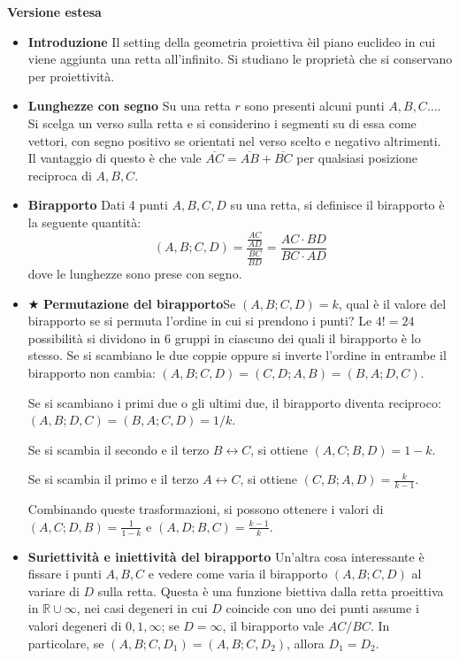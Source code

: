 \vspace{0.3cm}
\large{\textbf{Versione estesa}}\normalsize
\begin{itemize}

\vspace{0.3cm}
\item \textbf{Introduzione} Il setting della geometria proiettiva èil piano euclideo in cui viene aggiunta una retta all'infinito. Si studiano le proprietà che si conservano per proiettività.

\item \textbf{Lunghezze con segno} Su una retta $r$ sono presenti alcuni punti $A,B,C\ldots$. Si scelga un verso sulla retta e si considerino i segmenti su di essa come vettori, con segno positivo se orientati nel verso scelto e negativo altrimenti. Il vantaggio di questo è che vale $\overline{AC}=\overline{AB}+\overline{BC}$ per qualsiasi posizione reciproca di $A,B,C$.

\item \textbf{Birapporto} Dati 4 punti $A,B,C,D$ su una retta, si definisce il birapporto è la seguente quantità:
$$(A,B;C,D)=\frac{\frac{AC}{AD}}{\frac{BC}{BD}}=\frac{AC\cdot BD}{BC\cdot AD}$$
dove le lunghezze sono prese con segno.

\item $\bigstar$ \textbf{Permutazione del birapporto}Se $(A,B;C,D)=k$, qual è il valore del birapporto se si permuta l'ordine in cui si prendono i punti? Le $4!=24$ possibilità si dividono in $6$ gruppi in ciascuno dei quali il birapporto è lo stesso. Se si scambiano le due coppie oppure si inverte l'ordine in entrambe il birapporto non cambia: $(A,B;C,D)=(C,D;A,B)=(B,A;D,C)$.

Se si scambiano i primi due o gli ultimi due, il birapporto diventa reciproco: $(A,B;D,C)=(B,A;C,D)=1/k$.

Se si scambia il secondo e il terzo $B \leftrightarrow C$, si ottiene $(A,C;B,D)=1-k$.

Se si scambia il primo e il terzo $A \leftrightarrow C$, si ottiene $(C,B;A,D)=\frac{k}{k-1}$.


Combinando queste trasformazioni, si possono ottenere i valori di $(A,C;D,B)=\frac{1}{1-k}$ e $(A,D;B,C)=\frac{k-1}{k}$.

\item \textbf{Suriettività e iniettività del birapporto} Un'altra cosa interessante è fissare i punti $A,B,C$ e vedere come varia il birapporto $(A,B;C,D)$ al variare di $D$ sulla retta. Questa è una funzione biettiva dalla retta proeittiva in $\mathbb{R}\cup\infty$, nei casi degeneri in cui $D$ coincide con uno dei punti assume i valori degeneri di $0,1,\infty$; se $D=\infty$, il birapporto vale $AC/BC$. In particolare, se $(A,B;C,D_1)=(A,B;C,D_2)$, allora $D_1=D_2$.


\end{itemize}
